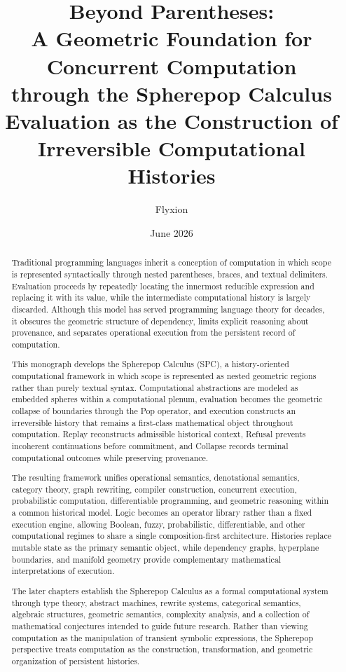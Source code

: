 \documentclass[12pt,oneside]{article}
\title{
{\Large\bfseries
Beyond Parentheses:\\[0.4em]
A Geometric Foundation for Concurrent Computation\\
through the Spherepop Calculus}
\\[1.2em]
{\large
Evaluation as the Construction of Irreversible Computational Histories}
}
\author{Flyxion}
\date{June 2026}
\theoremstyle{definition}
\theoremstyle{remark}
\begin{document}
\maketitle

\begin{abstract}

Traditional programming languages inherit a conception of computation in which scope is represented syntactically through nested parentheses, braces, and textual delimiters. Evaluation proceeds by repeatedly locating the innermost reducible expression and replacing it with its value, while the intermediate computational history is largely discarded. Although this model has served programming language theory for decades, it obscures the geometric structure of dependency, limits explicit reasoning about provenance, and separates operational execution from the persistent record of computation.

This monograph develops the Spherepop Calculus (SPC), a history-oriented computational framework in which scope is represented as nested geometric regions rather than purely textual syntax. Computational abstractions are modeled as embedded spheres within a computational plenum, evaluation becomes the geometric collapse of boundaries through the Pop operator, and execution constructs an irreversible history that remains a first-class mathematical object throughout computation. Replay reconstructs admissible historical context, Refusal prevents incoherent continuations before commitment, and Collapse records terminal computational outcomes while preserving provenance.

The resulting framework unifies operational semantics, denotational semantics, category theory, graph rewriting, compiler construction, concurrent execution, probabilistic computation, differentiable programming, and geometric reasoning within a common historical model. Logic becomes an operator library rather than a fixed execution engine, allowing Boolean, fuzzy, probabilistic, differentiable, and other computational regimes to share a single composition-first architecture. Histories replace mutable state as the primary semantic object, while dependency graphs, hyperplane boundaries, and manifold geometry provide complementary mathematical interpretations of execution.

The later chapters establish the Spherepop Calculus as a formal computational system through type theory, abstract machines, rewrite systems, categorical semantics, algebraic structures, geometric semantics, complexity analysis, and a collection of mathematical conjectures intended to guide future research. Rather than viewing computation as the manipulation of transient symbolic expressions, the Spherepop perspective treats computation as the construction, transformation, and geometric organization of persistent histories.

\end{abstract}
\end{document}
